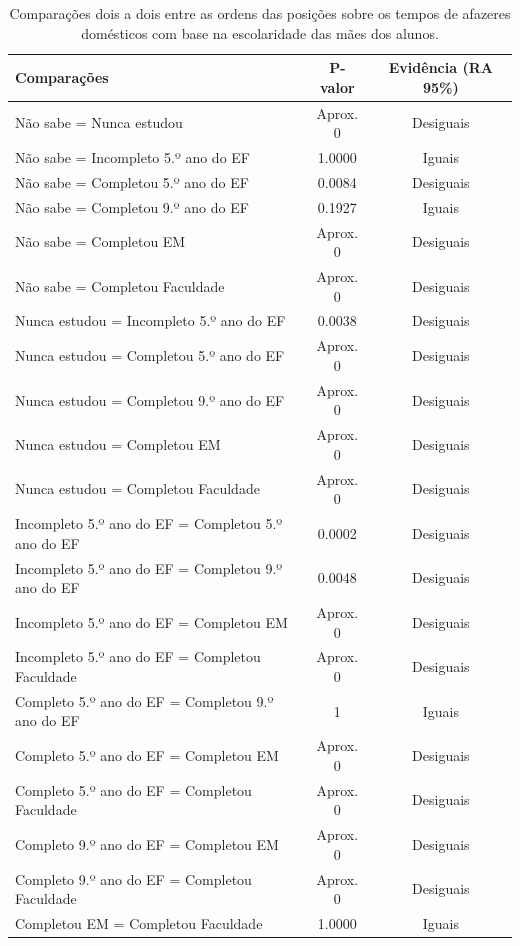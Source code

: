 \begin{table}[htb]
    \centering
\caption{Comparações dois a dois entre as ordens das posições sobre os tempos de afazeres domésticos
com base na escolaridade das mães dos alunos.}
    \begin{tabular}{lcc}
    \toprule
    Comparações & P-valor & Evidência (RA 95\%)\\
    \midrule \midrule
    Não sabe = Nunca estudou & Aprox. 0 & Desiguais\\
    Não sabe = Incompleto 5.º ano do EF  & 1.0000 & Iguais\\
    Não sabe = Completou 5.º ano do EF  & 0.0084 & Desiguais\\
    Não sabe = Completou 9.º ano do EF  & 0.1927 & Iguais\\
    Não sabe = Completou EM & Aprox. 0 & Desiguais\\
    Não sabe = Completou Faculdade & Aprox. 0 & Desiguais\\
    Nunca estudou = Incompleto 5.º ano do EF  & 0.0038 & Desiguais\\
    Nunca estudou = Completou 5.º ano do EF  & Aprox. 0 & Desiguais\\
    Nunca estudou = Completou 9.º ano do EF  & Aprox. 0 & Desiguais\\
    Nunca estudou = Completou EM & Aprox. 0 & Desiguais\\
    Nunca estudou = Completou Faculdade & Aprox. 0 & Desiguais\\
    Incompleto 5.º ano do EF = Completou 5.º ano do EF  & 0.0002 & Desiguais\\
    Incompleto 5.º ano do EF = Completou 9.º ano do EF  & 0.0048 & Desiguais\\
    Incompleto 5.º ano do EF = Completou EM & Aprox. 0 & Desiguais\\
    Incompleto 5.º ano do EF = Completou Faculdade & Aprox. 0 & Desiguais\\
    Completo 5.º ano do EF = Completou 9.º ano do EF  & 1 & Iguais\\
    Completo 5.º ano do EF = Completou EM & Aprox. 0 & Desiguais\\
    Completo 5.º ano do EF = Completou Faculdade & Aprox. 0 & Desiguais\\
    Completo 9.º ano do EF = Completou EM & Aprox. 0 & Desiguais\\
    Completo 9.º ano do EF = Completou Faculdade & Aprox. 0 & Desiguais\\
    Completou EM = Completou Faculdade & 1.0000 & Iguais\\
    \bottomrule
    \end{tabular}
    \centering
    
\end{table}



